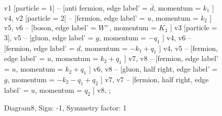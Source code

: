 \documentclass{revtex4}
\begin{document}
\begin{figure}[!htb]
\begin{center}
{    %
v1 [particle = \(1\)] -- [anti fermion, edge label' = \(\overline{d}\), momentum = \(k_{1}\) ] v4, 
v2 [particle = \(2\)] -- [fermion, edge label' = \(u\), momentum = \(k_{2}\) ] v5, 
v6 -- [boson, edge label' = \(W^{+}\), momentum = \(K_{3}\) ] v3 [particle = \(3\)], 
v5 -- [gluon, edge label' = \(g\), momentum = \(-q_{1}\) ] v4, 
v6 -- [fermion, edge label' = \(d\), momentum = \(-k_{1} + q_{1}\) ] v4, 
v5 -- [fermion, edge label' = \(u\), momentum = \(k_{2} + q_{1}\) ] v7, 
v8 -- [fermion, edge label' = \(u\), momentum = \(k_{2} + q_{1}\) ] v6, 
v8 -- [gluon, half right, edge label' = \(g\), momentum = \(-k_{2} - q_{1} + q_{2}\) ] v7, 
v7 -- [fermion, half right, edge label' = \(u\), momentum = \(q_{2}\) ] v8, 
};
\end{center}
\caption{Diagram8, Sign: -1, Symmetry factor: 1}
\end{figure}
\newpage
\end{document}
